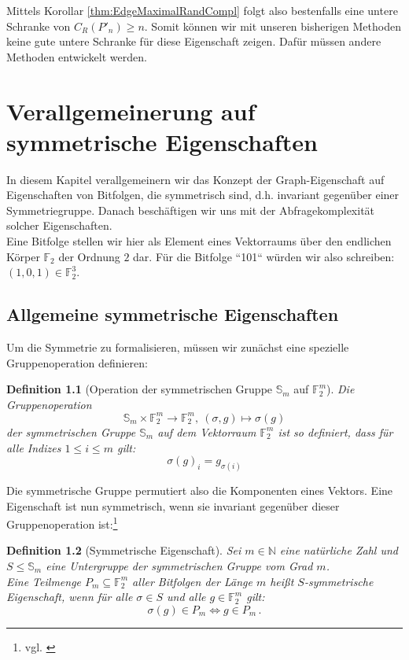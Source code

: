 \documentclass[10pt,a4paper, footheight=1mm]{scrreprt}
\newtheorem{definition}{Definition}
\theoremstyle{definition}
\begin{document}
Mittels Korollar \ref{thm:EdgeMaximalRandCompl} folgt also bestenfalls
eine untere Schranke von $C_R(P'_n) \geq n$. Somit können
wir mit unseren bisherigen Methoden keine gute untere Schranke
für diese Eigenschaft zeigen. Dafür müssen andere Methoden
entwickelt werden.

\chapter{Verallgemeinerung auf symmetrische Eigenschaften}
In diesem Kapitel verallgemeinern wir das Konzept der
Graph-Eigenschaft auf Eigenschaften von Bitfolgen, die
symmetrisch sind, d.h. invariant gegenüber einer Symmetriegruppe.
Danach beschäftigen wir uns mit der Abfragekomplexität
solcher Eigenschaften. \\
Eine Bitfolge stellen wir hier als Element eines Vektorraums
über den endlichen Körper $\mathbb{F}_2$ der Ordnung $2$ dar.
Für die Bitfolge ``101`` würden wir also schreiben:
$ (1,0,1) \in \mathbb{F}_2^3$.

\section{Allgemeine symmetrische Eigenschaften}
Um die Symmetrie zu formalisieren, müssen wir zunächst
eine spezielle Gruppenoperation definieren:

\begin{definition}
[Operation der symmetrischen Gruppe $\mathbb{S}_m$ auf $\mathbb{F}_2^m$]
Die Gruppenoperation
$$\mathbb{S}_m \times \mathbb{F}_2^m \to \mathbb{F}_2^m, 
  \ (\sigma,g) \mapsto \sigma(g)$$
der symmetrischen Gruppe $\mathbb{S}_m$ auf dem
Vektorraum $\mathbb{F}_2^m$ ist so definiert,
dass für alle Indizes $1\leq i \leq m$ gilt:
$$ \sigma(g)_i = g_{\sigma(i)} $$
\end{definition}
Die symmetrische Gruppe permutiert also die Komponenten eines
Vektors. Eine Eigenschaft ist nun symmetrisch, wenn sie invariant
gegenüber dieser Gruppenoperation ist:\footnote{vgl. \cite[S.7]{Rivest}}

\begin{definition}[Symmetrische Eigenschaft]
Sei $m\in \mathbb{N}$ eine natürliche Zahl und
$S \leq \mathbb{S}_m$ eine Untergruppe der 
symmetrischen Gruppe vom Grad $m$. \\
Eine Teilmenge
$P_m \subseteq \mathbb{F}_2^m$ aller Bitfolgen der
Länge $m$ heißt \emph{$S$-symmetrische Eigenschaft}, wenn
für alle $\sigma \in S$ und alle $g\in \mathbb{F}_2^m$ gilt:
$$ \sigma(g)\in P_m \iff g \in P_m\,.$$ 
\end{definition}
\end{document}
